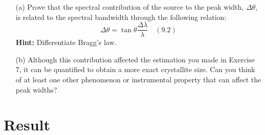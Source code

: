 \begin{enumerate}
    \item[(a)] Prove that the spectral contribution of the source to the peak width, \( \Delta \theta \), is related to the spectral bandwidth through the following relation:
    \[
    \Delta \theta = \tan \theta \frac{\Delta \lambda}{\lambda} \quad (9.2)
    \]
    \textbf{Hint:} Differentiate Bragg’s law.

    \item[(b)] Although this contribution affected the estimation you made in Exercise 7, it can be quantified to obtain a more exact crystallite size. Can you think of at least one other phenomenon or instrumental property that can affect the peak widths?
\end{enumerate}

\section{Result}




